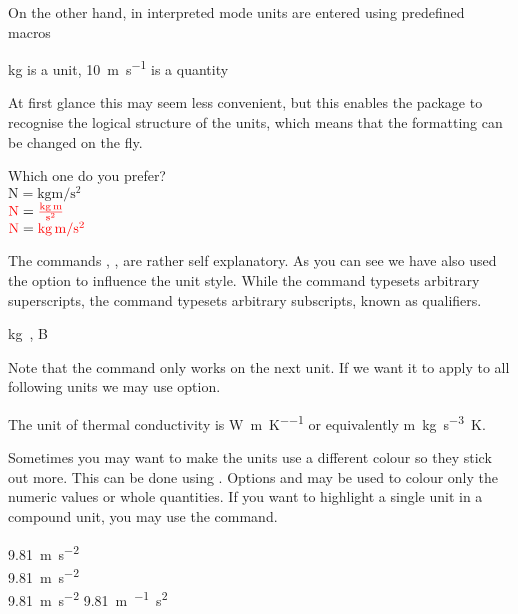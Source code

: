 On the other hand, in interpreted mode units are entered using predefined
macros
\begin{example}
\unit{\kilo\gram} is a unit,
\qty{10}{\metre\per\second}
is a quantity
\end{example}
At first glance this may seem less convenient, but this enables the package to
recognise the logical structure of the units, which means that the formatting
can be changed on the fly.
\begin{example}[examplewidth=0.32\linewidth]
Which one do you prefer? \\
$\unit{\newton} = \unit{
  \kilo\gram\metre\per\square\second}$ \\
$\unit{\newton} = \unit[per-mode = fraction]{
  \kilo\gram\metre\per\second\squared}$ \\
$\unit{\N} = \unit[per-mode = symbol]{
  \kg\m\per\s\tothe{2}}$
\end{example}
The commands , ,  are rather self explanatory. As you
can see we have also used the  option to influence the unit
style. While the command  typesets arbitrary superscripts, the
command  typesets arbitrary subscripts, known as qualifiers.
\begin{example}[examplewidth=0.32\linewidth]
\unit{\kg{}}, \unit{\bel{}}
\end{example}

Note that the  command only works on the next unit. If we want it to
apply to all following units we may use  option.
\begin{example}[examplewidth=0.4\linewidth]
The unit of thermal conductivity is
\unit{\watt\per\metre\per\kelvin}
or equivalently
\unit[sticky-per]{\m\kg\per\s\cubed\K}. 
\end{example}

Sometimes you may want to make the units use a different colour so they stick
out more. This can be done using . Options
 and  may be used to colour only the numeric
values or whole quantities. If you want to highlight a single unit in a
compound unit, you may use the  command.
\begin{example}[examplewidth=0.2\linewidth]
\qty[unit-color = red]{9.81}{\m\per\s\squared} \\
\qty[number-color = blue]{9.81}{\m\per\s\squared} \\
\qty[color = green]{9.81}{\m\per\s\squared}
\qty{9.81}{\m\per{}\s\squared}
\end{example}


